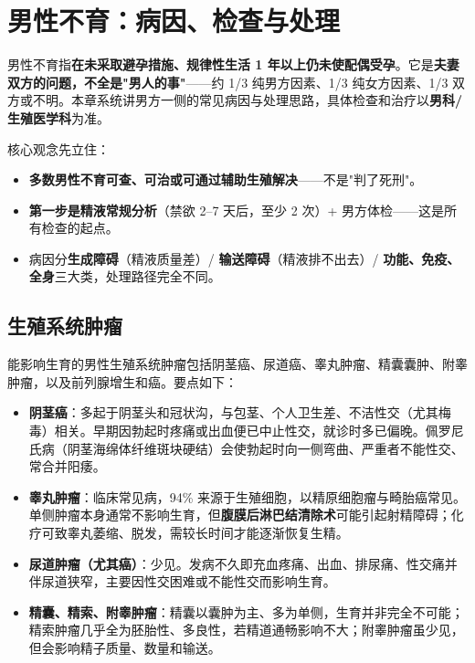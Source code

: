 \documentclass[12pt,UTF8,openany]{ctexbook}
\begin{document}


\clearpage
\chapter{男性不育：病因、检查与处理}
\label{chap:infertility}

男性不育指\textbf{在未采取避孕措施、规律性生活 1 年以上仍未使配偶受孕}。它是\textbf{夫妻双方的问题，不全是"男人的事"}——约 1/3 纯男方因素、1/3 纯女方因素、1/3 双方或不明。本章系统讲男方一侧的常见病因与处理思路，具体检查和治疗以\textbf{男科/生殖医学科}为准。

核心观念先立住：
\begin{itemize}[leftmargin=2em,itemsep=0.3em]
  \item \textbf{多数男性不育可查、可治或可通过辅助生殖解决}——不是"判了死刑"。
  \item \textbf{第一步是精液常规分析}（禁欲 2--7 天后，至少 2 次）+ 男方体检——这是所有检查的起点。
  \item 病因分\textbf{生成障碍}（精液质量差）/ \textbf{输送障碍}（精液排不出去）/ \textbf{功能、免疫、全身}三大类，处理路径完全不同。
\end{itemize}

\section{生殖系统肿瘤}

能影响生育的男性生殖系统肿瘤包括阴茎癌、尿道癌、睾丸肿瘤、精囊囊肿、附睾肿瘤，以及前列腺增生和癌。要点如下：

\begin{itemize}[leftmargin=2em,itemsep=0.3em]
  \item \textbf{阴茎癌}：多起于阴茎头和冠状沟，与包茎、个人卫生差、不洁性交（尤其梅毒）相关。早期因勃起时疼痛或出血便已中止性交，就诊时多已偏晚。佩罗尼氏病（阴茎海绵体纤维斑块硬结）会使勃起时向一侧弯曲、严重者不能性交、常合并阳痿。
  \item \textbf{睾丸肿瘤}：临床常见病，94\% 来源于生殖细胞，以精原细胞瘤与畸胎癌常见。单侧肿瘤本身通常不影响生育，但\textbf{腹膜后淋巴结清除术}可能引起射精障碍；化疗可致睾丸萎缩、脱发，需较长时间才能逐渐恢复生精。
  \item \textbf{尿道肿瘤（尤其癌）}：少见。发病不久即充血疼痛、出血、排尿痛、性交痛并伴尿道狭窄，主要因性交困难或不能性交而影响生育。
  \item \textbf{精囊、精索、附睾肿瘤}：精囊以囊肿为主、多为单侧，生育并非完全不可能；精索肿瘤几乎全为胚胎性、多良性，若精道通畅影响不大；附睾肿瘤虽少见，但会影响精子质量、数量和输送。
\end{itemize}
\end{document}

